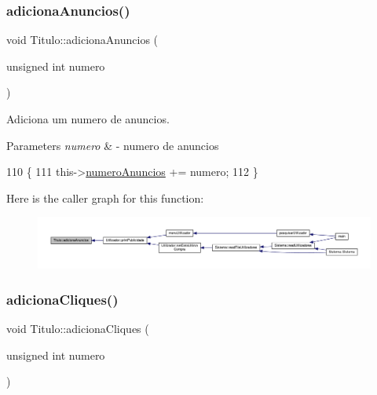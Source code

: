 \subsubsection{\texorpdfstring{adiciona\+Anuncios()}{adicionaAnuncios()}}
{\footnotesize\ttfamily void Titulo\+::adiciona\+Anuncios (\begin{DoxyParamCaption}\item[{unsigned int}]{numero }\end{DoxyParamCaption})}



Adiciona um numero de anuncios. 


\begin{DoxyParams}{Parameters}
{\em numero} & -\/ numero de anuncios \\
\hline
\end{DoxyParams}

\begin{DoxyCode}
110                                                   \{
111      this->\hyperlink{classTitulo_a31919af9268f0c6e55b786457d1df586}{numeroAnuncios} += numero;
112  \}
\end{DoxyCode}
Here is the caller graph for this function\+:
\nopagebreak
\begin{figure}[H]
\begin{center}
\leavevmode
\includegraphics[width=350pt]{classTitulo_a8004d12b8ae0d0746b999a6411df150c_icgraph}
\end{center}
\end{figure}
\mbox{\label{classTitulo_a0cf99e4a2b522a7acae425593e87efec}} 
\subsubsection{\texorpdfstring{adiciona\+Cliques()}{adicionaCliques()}}
{\footnotesize\ttfamily void Titulo\+::adiciona\+Cliques (\begin{DoxyParamCaption}\item[{unsigned int}]{numero }\end{DoxyParamCaption})}



